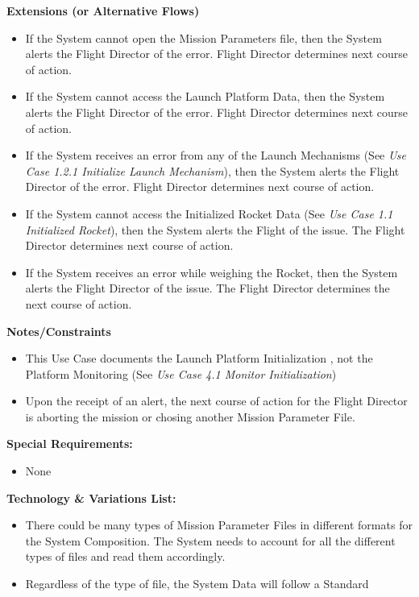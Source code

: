 \documentclass[letterpaper]{article}
\begin{document}
\textbf{Extensions (or Alternative Flows)}
\begin{itemize}
   \item[2a.]If the System cannot open the Mission Parameters file,
      then the System alerts the Flight Director of the error. Flight
      Director determines next course of action.
   \item[3a.]If the System cannot access the Launch Platform Data,
      then the System alerts the Flight Director of the error. Flight
      Director determines next course of action.
   \item[5a.,6a.]If the System receives an error from any of the
      Launch Mechanisms (See \textit{Use Case 1.2.1 Initialize Launch
      Mechanism}), then the System alerts the Flight Director of the
      error. Flight Director determines next course of action.
   \item[7a.]If the System cannot access the Initialized Rocket Data
      (See \textit{Use Case 1.1 Initialized Rocket}), then the System
      alerts the Flight of the issue.  The Flight Director determines
      next course of action.
   \item[8a.]If the System receives an error while weighing the
      Rocket, then the System alerts the Flight Director of the issue.
      The Flight Director determines the next course of action.
\end{itemize}
\textbf{Notes/Constraints}
\begin{itemize}
   \item[*a]This Use Case documents the Launch Platform Initialization
      , not the Platform Monitoring (See \textit{Use Case 4.1 Monitor
      Initialization})
   \item[*b]Upon the receipt of an alert, the next course of action
      for the Flight Director is aborting the mission or chosing
      another Mission Parameter File.
\end{itemize}
\textbf{Special Requirements:}
\begin{itemize}
   \item None
\end{itemize}
\textbf{Technology \& Variations List:}
\begin{itemize}
   \item There could be many types of Mission Parameter Files in
      different formats for the System Composition.  The System needs
      to account for all the different types of files and read them
      accordingly.
   \item Regardless of the type of file, the System Data will follow
      a Standard
\end{itemize}
\end{document}
